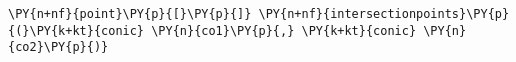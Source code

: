 \begin{Verbatim}[commandchars=\\\{\}]
    \PY{n+nf}{point}\PY{p}{[}\PY{p}{]} \PY{n+nf}{intersectionpoints}\PY{p}{(}\PY{k+kt}{conic} \PY{n}{co1}\PY{p}{,} \PY{k+kt}{conic} \PY{n}{co2}\PY{p}{)}
\end{Verbatim}
